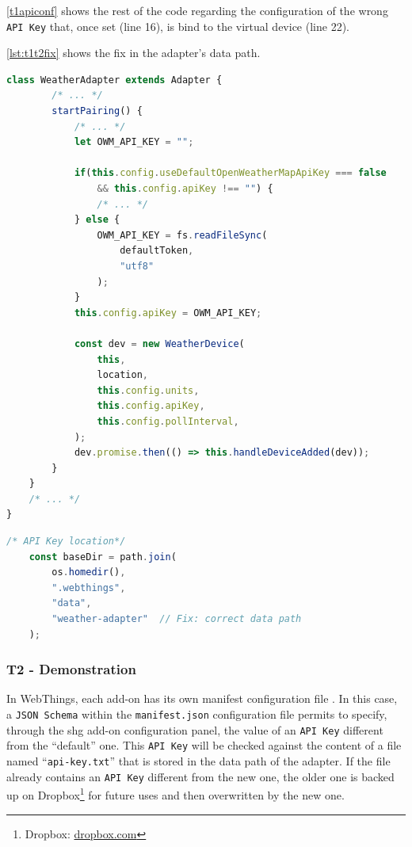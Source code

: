 \autoref{t1apiconf} shows the rest of the code regarding the configuration of the wrong \texttt{API Key} that, once set (line 16), is bind to the virtual device (line 22). 

\autoref{lst:t1t2fix} shows the fix in the adapter's data path.

\begin{lstlisting}[language=JavaScript, label=t1apiconf, caption=T1 -  Wrong \texttt{API Key} configuration]    
    class WeatherAdapter extends Adapter {
        /* ... */
        startPairing() {
            /* ... */
            let OWM_API_KEY = "";

            if(this.config.useDefaultOpenWeatherMapApiKey === false 
                && this.config.apiKey !== "") {
                /* ... */
            } else {
                OWM_API_KEY = fs.readFileSync(
                    defaultToken,
                    "utf8"
                );
            }
            this.config.apiKey = OWM_API_KEY;

            const dev = new WeatherDevice(
                this,
                location,
                this.config.units,
                this.config.apiKey,
                this.config.pollInterval,
            );
            dev.promise.then(() => this.handleDeviceAdded(dev));   
        }
    }
    /* ... */
}
\end{lstlisting}

\begin{lstlisting}[language=JavaScript, label=lst:t1t2fix, caption=T1 \& T2 - Correct data path]
    /* API Key location*/
    const baseDir = path.join(
        os.homedir(),
        ".webthings",
        "data",
        "weather-adapter"  // Fix: correct data path
    );
\end{lstlisting}


\subsubsection{T2 - Demonstration}
\label{t2poc}

In WebThings, each add-on has its own manifest  configuration file \cite{manifestjson}. In this case, a \texttt{JSON Schema} within the \texttt{manifest.json} configuration file permits to specify, through the \gls{shg} add-on configuration panel, the value of an \texttt{API Key} different from the ``default'' one. This \texttt{API Key} will be checked against the content of a file named ``\texttt{api-key.txt}'' that is stored in the data path of the adapter. If the file already contains an \texttt{API Key} different from the new one, the older one is backed up on Dropbox\footnote{Dropbox: \href{https://www.dropbox.com/}{dropbox.com}} for future uses and then overwritten by the new one.

